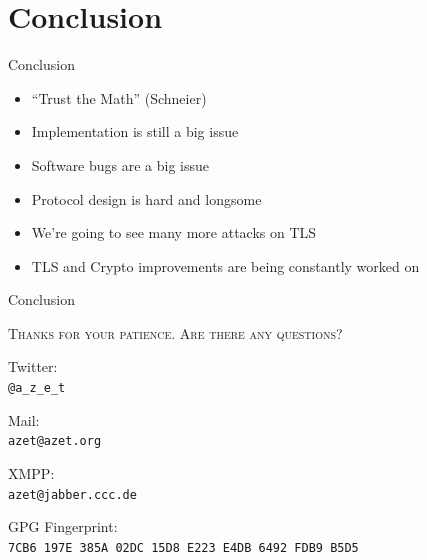 \documentclass[hyperref={draft}]{beamer}
\begin{document}
\section{Conclusion}
\begin{frame}{Conclusion}
  \begin{itemize}
    \item ``Trust the Math'' (Schneier)
    \item Implementation is still a big issue
    \item Software bugs are a big issue
    \item Protocol design is hard and longsome
    \item We're going to see many more attacks on TLS
    \item TLS and Crypto improvements are being constantly worked on
  \end{itemize} 
\end{frame}

\begin{frame}{Conclusion}
  \begin{center}
    \textsc{Thanks for your patience. Are there any questions?}
  \end{center}
  \begin{center}
    Twitter:\\
    \texttt{@a\_z\_e\_t}
    
    
    Mail:\\
    \texttt{azet@azet.org}
    
    
    XMPP:\\
    \texttt{azet@jabber.ccc.de}
    
    
    GPG Fingerprint:\\
    \texttt{7CB6 197E 385A 02DC 15D8 E223 E4DB 6492 FDB9 B5D5}
  \end{center}
\end{frame}


\end{document}

